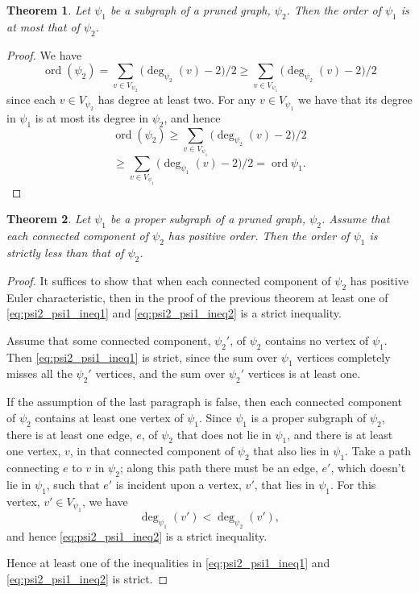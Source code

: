 \documentclass{memo-l}
\theoremstyle{plain}
\newtheorem{theorem}{Theorem}[section]
\theoremstyle{definition}
\numberwithin{section}{chapter}
\numberwithin{equation}{chapter}
\DeclareMathOperator{\ord}{ord}
\theoremstyle{plain}
\theoremstyle{definition}
\begin{document}
\begin{theorem}
\label{th:pruned_inclusion}
Let $\psi_1$ be a subgraph of 
a pruned graph, $\psi_2$.
Then the order of $\psi_1$ is
at most that of $\psi_2$.
\end{theorem}
\begin{proof}
We have
$$
\ord(\psi_2) =
\sum_{v\in V_{\psi_2}} \bigl(\deg_{\psi_2}(v) -2 \bigr)/2
\ge
\sum_{v\in V_{\psi_1}} \bigl(\deg_{\psi_2}(v) -2 \bigr)/2
$$
since each $v\in V_{\psi_2}$ has degree at least two.
For any $v\in V_{\psi_1}$ we have that its degree in $\psi_1$ is
at most its degree in $\psi_2$, and hence
\begin{equation}\label{eq:psi2_psi1_ineq1}
\ord(\psi_2) \ge 
\sum_{v\in V_{\psi_1}} \bigl(\deg_{\psi_2}(v) -2 \bigr)/2
\end{equation}
\begin{equation}\label{eq:psi2_psi1_ineq2}
\ge 
\sum_{v\in V_{\psi_1}} \bigl(\deg_{\psi_1}(v) -2 \bigr)/2
=\ord{\psi_1}.
\end{equation}
\end{proof}

\begin{theorem}
\label{th:strict_pruned_inclusion}
Let $\psi_1$ be a proper subgraph of 
a pruned graph, $\psi_2$.  Assume that each connected component of
$\psi_2$ has positive order.
Then the order of $\psi_1$ is
strictly less than that of $\psi_2$.
\end{theorem}
\begin{proof}
It suffices to show that when each connected component of $\psi_2$ has
positive Euler characteristic, then in the proof of the previous
theorem at least one of
\eqref{eq:psi2_psi1_ineq1} and 
\eqref{eq:psi2_psi1_ineq2} is a strict inequality.

Assume that some connected component, $\psi_2'$, of $\psi_2$ 
contains no vertex of $\psi_1$.  
Then
\eqref{eq:psi2_psi1_ineq1} is strict,
since the sum over $\psi_1$ vertices completely misses all the $\psi_2'$
vertices, and
the sum over $\psi_2'$ vertices is at least one.

If the assumption of the last paragraph is false, then
each connected component of $\psi_2$ contains at least one vertex of
$\psi_1$.  Since $\psi_1$ is a proper subgraph of $\psi_2$, there is
at least one edge, $e$, of $\psi_2$ that does not lie in $\psi_1$,
and there is at least one vertex, $v$, in that connected component of
$\psi_2$ that also lies in $\psi_1$.  Take a path connecting $e$
to $v$ in $\psi_2$; along this path there must be an edge, $e'$,
which doesn't lie in $\psi_1$, such that $e'$ is incident upon a
vertex, $v'$, that lies in $\psi_1$.  For this vertex, $v'\in V_{\psi_1}$,
we have
$$
\deg_{\psi_1}(v') < \deg_{\psi_2}(v'),
$$
and hence \eqref{eq:psi2_psi1_ineq2} is a strict inequality.

Hence at least one of the inequalities in \eqref{eq:psi2_psi1_ineq1} and
\eqref{eq:psi2_psi1_ineq2} is strict.
\end{proof}
\end{document}
